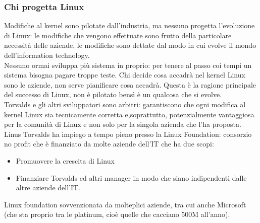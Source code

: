 \documentclass{article}
\begin{document}
\subsubsection{Chi progetta Linux}
Modifiche al kernel sono pilotate dall'industria, ma nessuno progetta l'evoluzione di Linux: le modifiche che vengono effettuate sono frutto della particolare necessità delle aziende, le modifiche sono dettate dal modo in cui evolve il mondo dell'information technology.\\ Nessuno ormai sviluppa più sistema in proprio: per tenere al passo coi tempi un sistema bisogna pagare troppe teste. Chi decide cosa accadrà nel kernel Linux sono le aziende, non serve pianificare cosa accadrà. Questa è la ragione principale del successo di Linux, non è pilotato bensì è un qualcosa che si evolve.\\ Torvalds e gli altri sviluppatori sono arbitri: garantiscono che ogni modifica al kernel Linux sia tecnicamente corretta e,soprattutto, potenzialmente vantaggiosa per la comunità di Linux e non solo per la singola azienda che l'ha proposta.\\ Linus Torvalds ha impiego a tempo pieno presso la Linux Foundation: consorzio no profit che è finanziato da molte aziende dell'IT che ha due scopi:
\begin{itemize}
\item Promuovere la crescita di Linux
\item Finanziare Torvalds ed altri manager in modo che siano indipendenti dalle altre aziende dell'IT.
\end{itemize}
Linux foundation sovvenzionata da molteplici aziende, tra cui anche Microsoft (che sta proprio tra le platinum, cioè quelle che cacciano 500M all'anno).
\end{document}
